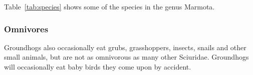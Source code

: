 \documentclass{article}
\begin{document}
Table~\ref{tab:species} shows some of the species in the genus Marmota.

\subsubsection{Omnivores}
Groundhogs also occasionally eat grubs, grasshoppers, insects, snails and other small animals,
but are not as omnivorous as many other Sciuridae.  Groundhogs will occasionally eat baby birds
they come upon by accident.
\end{document}
